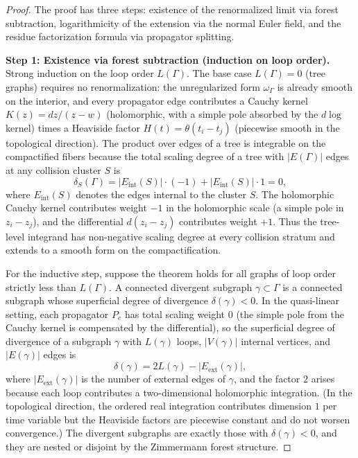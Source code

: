 \begin{proof}
The proof has three steps: existence of the renormalized limit via forest subtraction, logarithmicity of the extension via the normal Euler field, and the residue factorization formula via propagator splitting.

\medskip
\textbf{Step 1: Existence via forest subtraction (induction on loop order).}
Strong induction on the loop order $L(\Gamma)$. The base case $L(\Gamma)=0$ (tree graphs) requires no renormalization: the unregularized form $\omega_\Gamma$ is already smooth on the interior, and every propagator edge contributes a Cauchy kernel $K(z) = dz/(z-w)$ (holomorphic, with a simple pole absorbed by the $d\log$ kernel) times a Heaviside factor $H(t) = \theta(t_i - t_j)$ (piecewise smooth in the topological direction). The product over edges of a tree is integrable on the compactified fibers because the total scaling degree of a tree with $|E(\Gamma)|$ edges at any collision cluster $S$ is
\[
 \delta_S(\Gamma) = |E_{\mathrm{int}}(S)| \cdot (-1) + |E_{\mathrm{int}}(S)| \cdot 1 = 0,
\]
where $E_{\mathrm{int}}(S)$ denotes the edges internal to the cluster $S$. The holomorphic Cauchy kernel contributes weight $-1$ in the holomorphic scale (a simple pole in $z_i - z_j$), and the differential $d(z_i - z_j)$ contributes weight $+1$. Thus the tree-level integrand has non-negative scaling degree at every collision stratum and extends to a smooth form on the compactification.

For the inductive step, suppose the theorem holds for all graphs of loop order strictly less than $L(\Gamma)$. A connected divergent subgraph $\gamma \subset \Gamma$ is a connected subgraph whose superficial degree of divergence $\delta(\gamma) < 0$. In the quasi-linear setting, each propagator $P_e$ has total scaling weight $0$ (the simple pole from the Cauchy kernel is compensated by the differential), so the superficial degree of divergence of a subgraph $\gamma$ with $L(\gamma)$ loops, $|V(\gamma)|$ internal vertices, and $|E(\gamma)|$ edges is
\[
 \delta(\gamma) = 2L(\gamma) - |E_{\mathrm{ext}}(\gamma)|,
\]
where $|E_{\mathrm{ext}}(\gamma)|$ is the number of external edges of $\gamma$, and the factor $2$ arises because each loop contributes a two-dimensional holomorphic integration. (In the topological direction, the ordered real integration contributes dimension $1$ per time variable but the Heaviside factors are piecewise constant and do not worsen convergence.) The divergent subgraphs are exactly those with $\delta(\gamma) < 0$, and they are nested or disjoint by the Zimmermann forest structure.


\end{proof}
